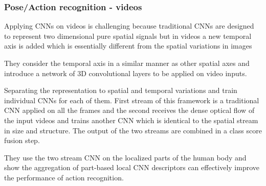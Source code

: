 \begin{frame}
\frametitle{Pose/Action recognition - videos}


Applying CNNs on videos is challenging because traditional CNNs are designed to represent two dimensional pure spatial signals but in videos a new temporal axis is added which is essentially different from the spatial variations in images

\medskip 


They consider the temporal axis in a similar manner as other spatial axes and introduce a network of 3D convolutional layers to be applied on video inputs.

\medskip 


Separating the representation to spatial and temporal variations and train individual CNNs for each of them. First stream of this framework is a traditional CNN applied on all the frames and the second receives the dense optical flow of the input videos and trains another CNN which is identical to the spatial stream in size and structure. The output of the two streams are combined in a class score fusion step. 

\medskip 


They use the two stream CNN on the localized parts of the human body and show the aggregation of part-based local CNN descriptors can effectively improve the performance of action recognition.

%
\end{frame}


